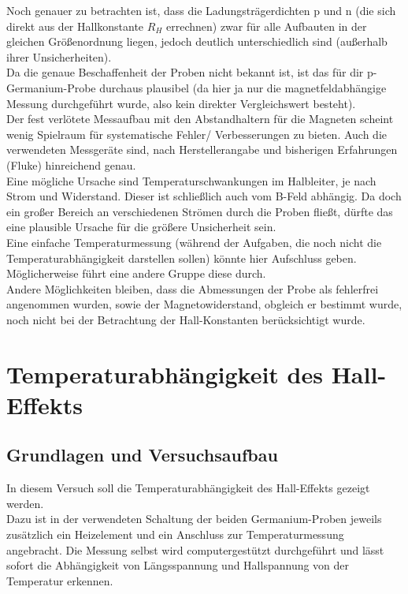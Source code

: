 \documentclass[12pt,a4paper]{article}
\begin{document}
\begin{multicols}{2}
Noch genauer zu betrachten ist, dass die Ladungsträgerdichten p und n (die sich direkt aus der Hallkonstante $R_H$ errechnen) zwar für alle Aufbauten in der gleichen Größenordnung liegen, jedoch deutlich unterschiedlich sind (außerhalb ihrer Unsicherheiten).\\
Da die genaue Beschaffenheit der Proben nicht bekannt ist, ist das für dir p-Germanium-Probe durchaus plausibel (da hier ja nur die magnetfeldabhängige Messung durchgeführt wurde, also kein direkter Vergleichswert besteht).\\
Der fest verlötete Messaufbau mit den Abstandhaltern für die Magneten scheint wenig Spielraum für systematische Fehler/ Verbesserungen zu bieten. Auch die verwendeten Messgeräte sind, nach Herstellerangabe und bisherigen Erfahrungen (Fluke) hinreichend genau.\\
Eine mögliche Ursache sind Temperaturschwankungen im Halbleiter, je nach Strom und Widerstand. Dieser ist schließlich auch vom B-Feld abhängig. Da doch ein großer Bereich an verschiedenen Strömen durch die Proben fließt, dürfte das eine plausible Ursache für die größere Unsicherheit sein.\\
Eine einfache Temperaturmessung (während der Aufgaben, die noch nicht die Temperaturabhängigkeit darstellen sollen) könnte hier Aufschluss geben. Möglicherweise führt eine andere Gruppe diese durch.\\
Andere Möglichkeiten bleiben, dass die Abmessungen der Probe als fehlerfrei angenommen wurden, sowie der Magnetowiderstand, obgleich er bestimmt wurde, noch nicht bei der Betrachtung der Hall-Konstanten berücksichtigt wurde.



\section{Temperaturabhängigkeit des Hall-Effekts}

\subsection{Grundlagen und Versuchsaufbau}
In diesem Versuch soll die Temperaturabhängigkeit des Hall-Effekts gezeigt werden.\\
Dazu ist in der verwendeten Schaltung der beiden Germanium-Proben jeweils zusätzlich ein Heizelement und ein Anschluss zur Temperaturmessung angebracht. Die Messung selbst wird computergestützt durchgeführt und lässt sofort die Abhängigkeit von Längsspannung und Hallspannung von der Temperatur erkennen.\\


\end{multicols}
\end{document}
